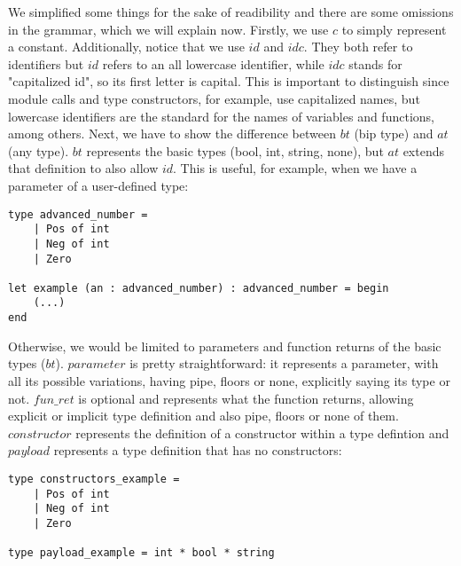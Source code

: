 We simplified some things for the sake of readibility and there are some omissions in the grammar, which we will explain now.
Firstly, we use $c$ to simply represent a constant.
Additionally, notice that we use $id$ and $idc$.
They both refer to identifiers but $id$ refers to an all lowercase identifier, while $idc$ stands for "capitalized id", so its first letter is capital.
This is important to distinguish since module calls and type constructors, for example, use capitalized names, but lowercase identifiers are the standard for the names of variables and functions, among others.
Next, we have to show the difference between $bt$ (bip type) and $at$ (any type).
$bt$ represents the basic types (bool, int, string, none), but $at$ extends that definition to also allow $id$.
This is useful, for example, when we have a parameter of a user-defined type:

\begin{lstlisting}[mathescape, basicstyle=\ttfamily, columns=flexible,
                    emph={type, and, let, rec, if, then, else, mod, in, for, while, do, done, to, begin, end, assert, match, with, of, open, include,ref},
                    emphstyle=\ttfamily\bfseries\color{myorange}]
type advanced_number = 
	| Pos of int
	| Neg of int
	| Zero

let example (an : advanced_number) : advanced_number = begin
	(...)
end
\end{lstlisting}

Otherwise, we would be limited to parameters and function returns of the basic types ($bt$).
$parameter$ is pretty straightforward: it represents a parameter, with all its possible variations, having pipe, floors or none, explicitly saying its type or not.
$fun\_ret$ is optional and represents what the function returns, allowing explicit or implicit type definition and also pipe, floors or none of them.
$constructor$ represents the definition of a constructor within a type defintion and $payload$ represents a type definition that has no constructors:

\begin{lstlisting}[mathescape, basicstyle=\ttfamily, columns=flexible,
                    emph={type, and, let, rec, if, then, else, mod, in, for, while, do, done, to, begin, end, assert, match, with, of, open, include,ref},
                    emphstyle=\ttfamily\bfseries\color{myorange}]
type constructors_example = 
	| Pos of int
	| Neg of int
	| Zero

type payload_example = int * bool * string
\end{lstlisting}

